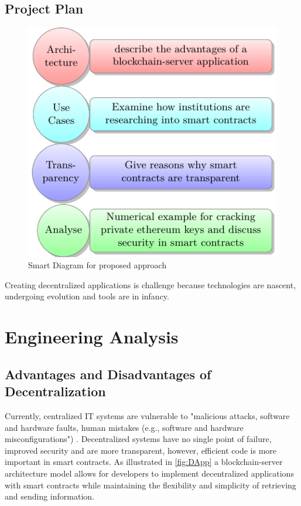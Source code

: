 \documentclass[12pt]{scrreprt}
\begin{document}
  	\section{Project Plan}
 	\begin{figure}[ht]
   	\centering 
   	\includegraphics[width=1\linewidth]{ms-II/smartDiagramProjectPlan.pdf}
   	\caption{Smart Diagram for proposed approach}
   	\label{toplogy}
   	\end{figure}
   	 	Creating decentralized applications is challenge because technologies are nascent, undergoing evolution and tools are in infancy.


\chapter{Engineering Analysis}

\section{Advantages and Disadvantages of Decentralization }
Currently, centralized IT systems are vulnerable to "malicious attacks, software and hardware faults, human mistakes (e.g., software and hardware misconfigurations") \cite{5936160}. Decentralized systems have no single point of failure, improved security and are more transparent, however, efficient code is more important in smart contracts. As illustrated in \ref*{fig:DApp} a blockchain-server architecture model allows for developers to implement decentralized applications with smart contracts while maintaining the flexibility and simplicity of retrieving and sending information.
 
\end{document}
